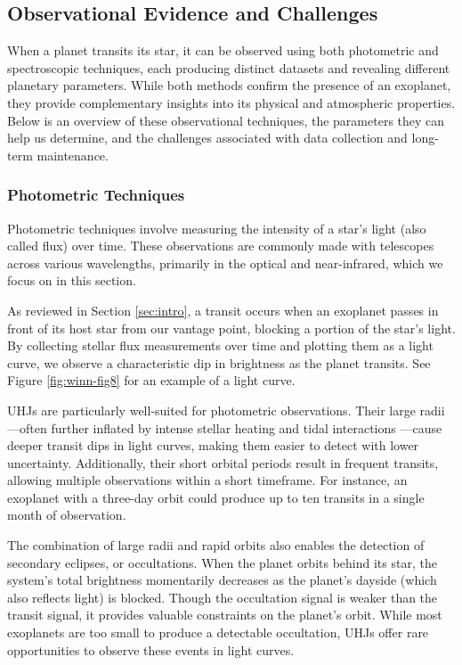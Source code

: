 \documentclass[oneside,12pt]{amsart}
\numberwithin{page}{section}
\begin{document}
\subsection{Observational Evidence and Challenges}\label{sec:obs}

When a planet transits its star, it can be observed using both photometric and spectroscopic techniques, each producing distinct datasets and revealing different planetary parameters. While both methods confirm the presence of an exoplanet, they provide complementary insights into its physical and atmospheric properties. Below is an overview of these observational techniques, the parameters they can help us determine, and the challenges associated with data collection and long-term maintenance.

\subsubsection{Photometric Techniques}\label{sec:obs-photo}

Photometric techniques involve measuring the intensity of a star’s light (also called flux) over time. These observations are commonly made with telescopes across various wavelengths, primarily in the optical and near-infrared, which we focus on in this section.

As reviewed in Section \ref{sec:intro}, a transit occurs when an exoplanet passes in front of its host star from our vantage point, blocking a portion of the star’s light. By collecting stellar flux measurements over time and plotting them as a light curve, we observe a characteristic dip in brightness as the planet transits. See Figure \ref{fig:winn-fig8} for an example of a light curve.

UHJs are particularly well-suited for photometric observations. Their large radii—often further inflated by intense stellar heating and tidal interactions \citep{ogilvie2014tidal}—cause deeper transit dips in light curves, making them easier to detect with lower uncertainty. Additionally, their short orbital periods result in frequent transits, allowing multiple observations within a short timeframe. For instance, an exoplanet with a three-day orbit could produce up to ten transits in a single month of observation.

The combination of large radii and rapid orbits also enables the detection of secondary eclipses, or occultations. When the planet orbits behind its star, the system’s total brightness momentarily decreases as the planet’s dayside (which also reflects light) is blocked. Though the occultation signal is weaker than the transit signal, it provides valuable constraints on the planet’s orbit. While most exoplanets are too small to produce a detectable occultation, UHJs offer rare opportunities to observe these events in light curves.
\end{document}
